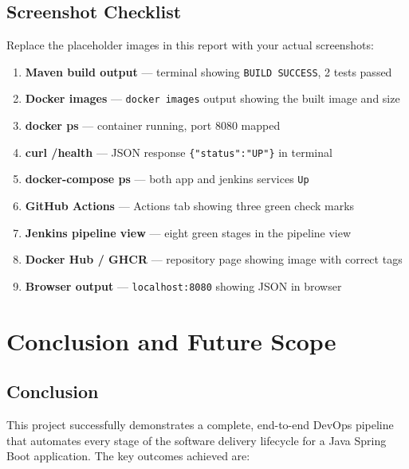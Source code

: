 \documentclass[12pt,a4paper]{report}
\begin{document}
\section{Screenshot Checklist}

Replace the placeholder images in this report with your actual screenshots:

\begin{enumerate}[leftmargin=*, label=\arabic*.]
  \item \textbf{Maven build output} — terminal showing \texttt{BUILD SUCCESS}, 2 tests passed
  \item \textbf{Docker images} — \texttt{docker images} output showing the built image and size
  \item \textbf{docker ps} — container running, port 8080 mapped
  \item \textbf{curl /health} — JSON response \texttt{\{"status":"UP"\}} in terminal
  \item \textbf{docker-compose ps} — both app and jenkins services \texttt{Up}
  \item \textbf{GitHub Actions} — Actions tab showing three green check marks
  \item \textbf{Jenkins pipeline view} — eight green stages in the pipeline view
  \item \textbf{Docker Hub / GHCR} — repository page showing image with correct tags
  \item \textbf{Browser output} — \texttt{localhost:8080} showing JSON in browser
\end{enumerate}


\chapter{Conclusion and Future Scope}

\section{Conclusion}

This project successfully demonstrates a complete, end-to-end DevOps pipeline that automates every stage of the software delivery lifecycle for a Java Spring Boot application. The key outcomes achieved are:
\end{document}
